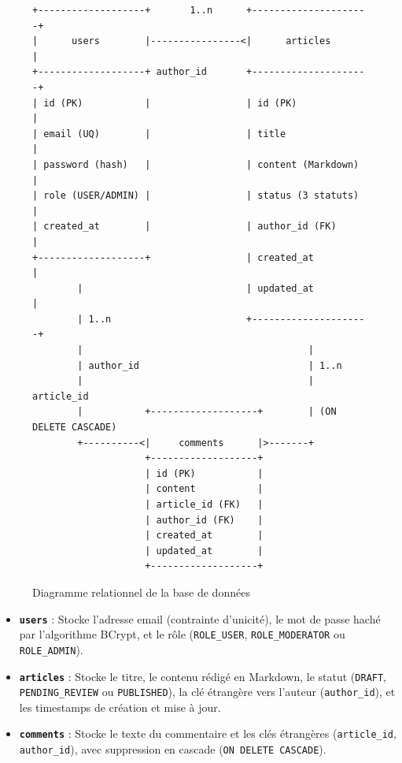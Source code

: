 \documentclass[11pt,a4paper]{article}
\begin{document}
\begin{figure}[htbp]
\centering
\begin{verbatim}
+-------------------+       1..n      +---------------------+
|      users        |----------------<|      articles       |
+-------------------+ author_id       +---------------------+
| id (PK)           |                 | id (PK)             |
| email (UQ)        |                 | title               |
| password (hash)   |                 | content (Markdown)  |
| role (USER/ADMIN) |                 | status (3 statuts)  |
| created_at        |                 | author_id (FK)      |
+-------------------+                 | created_at          |
        |                             | updated_at          |
        | 1..n                        +---------------------+
        |                                        |
        | author_id                              | 1..n
        |                                        | article_id
        |           +-------------------+        | (ON DELETE CASCADE)
        +----------<|     comments      |>-------+
                    +-------------------+
                    | id (PK)           |
                    | content           |
                    | article_id (FK)   |
                    | author_id (FK)    |
                    | created_at        |
                    | updated_at        |
                    +-------------------+
\end{verbatim}
\caption{Diagramme relationnel de la base de données}
\label{fig:erd}
\end{figure}

\begin{itemize}
    \item \textbf{\texttt{users}} : Stocke l'adresse email (contrainte d'unicité), le mot de passe haché par l'algorithme BCrypt, et le rôle (\texttt{ROLE\_USER}, \texttt{ROLE\_MODERATOR} ou \texttt{ROLE\_ADMIN}).
    \item \textbf{\texttt{articles}} : Stocke le titre, le contenu rédigé en Markdown, le statut (\texttt{DRAFT}, \texttt{PENDING\_REVIEW} ou \texttt{PUBLISHED}), la clé étrangère vers l'auteur (\texttt{author\_id}), et les timestamps de création et mise à jour.
    \item \textbf{\texttt{comments}} : Stocke le texte du commentaire et les clés étrangères (\texttt{article\_id}, \texttt{author\_id}), avec suppression en cascade (\texttt{ON DELETE CASCADE}).
\end{itemize}
\end{document}
